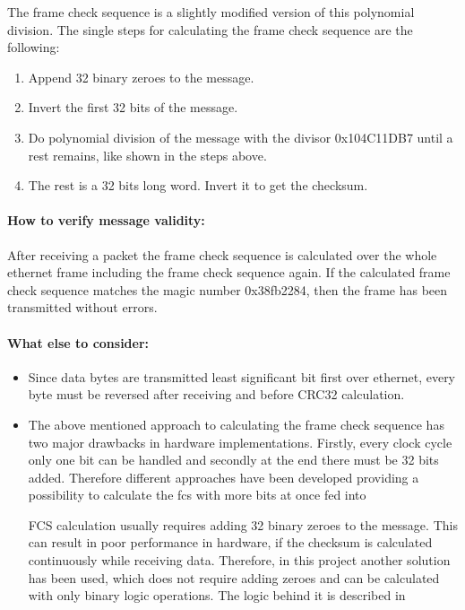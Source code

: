The frame check sequence is a slightly modified version of this polynomial division. The single steps for calculating the frame check sequence are the following:
\begin{enumerate}
  \item Append 32 binary zeroes to the message.
  \item Invert the first 32 bits of the message.
  \item Do polynomial division of the message with the divisor 0x104C11DB7 until a rest remains, like shown in the steps above.
  \item The rest is a 32 bits long word. Invert it to get the checksum.
\end{enumerate}

\paragraph{How to verify message validity:}
After receiving a packet the frame check sequence is calculated over the whole ethernet frame including the frame check sequence again. If the calculated frame check sequence matches the magic number 0x38fb2284, then the frame has been transmitted without errors.

\paragraph{What else to consider:}
\begin{itemize}
  \item Since data bytes are transmitted least significant bit first over ethernet, every byte must be reversed after receiving and before CRC32 calculation.
  \item The above mentioned approach to calculating the frame check sequence has two major drawbacks in hardware implementations. Firstly, every clock cycle only one bit can be handled and secondly at the end there must be 32 bits added. Therefore different approaches have been developed providing a possibility to calculate the fcs with more bits at once fed into
  
  FCS calculation usually requires adding 32 binary zeroes to the message. This can result in poor performance in hardware, if the checksum is calculated continuously while receiving data. Therefore, in this project another solution has been used, which does not require adding zeroes and can be calculated with only binary logic operations. The logic behind it is described in 
\end{itemize}
